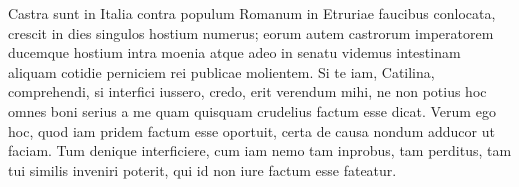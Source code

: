 \documentclass[12pt, twoside]{article}
\begin{document}
Castra sunt in Italia contra populum Romanum in Etruriae faucibus conlocata, crescit in dies singulos hostium numerus; eorum autem castrorum imperatorem ducemque hostium intra moenia atque adeo in senatu videmus intestinam aliquam cotidie perniciem rei publicae molientem. Si te iam, Catilina, comprehendi, si interfici iussero, credo, erit verendum mihi, ne non potius hoc omnes boni serius a me quam quisquam crudelius factum esse dicat. Verum ego hoc, quod iam pridem factum esse oportuit, certa de causa nondum adducor ut faciam. Tum denique interficiere, cum iam nemo tam inprobus, tam perditus, tam tui similis inveniri poterit, qui id non iure factum esse fateatur.
\end{document}

